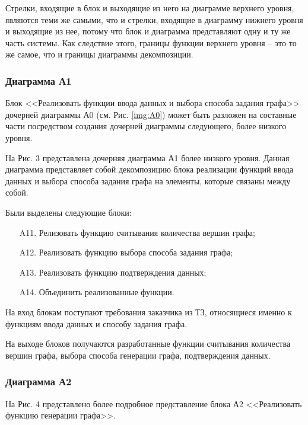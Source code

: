 \documentclass[a4paper, final]{article}
\begin{document}
Стрелки, входящие в блок и выходящие из него на диаграмме верхнего уровня, являются теми же самыми, что и стрелки, 
входящие в диаграмму нижнего уровня и выходящие из нее, потому что блок и диаграмма представляют одну и ту же 
часть системы. Как следствие этого, границы функции верхнего уровня 
-- это то же самое, что и границы диаграммы декомпозиции.

\newpage
\hypertarget{img:A0}{}



\subsubsection{Диаграмма А1}
Блок <<Реализовать функции ввода данных и выбора способа задания графа>> дочерней диаграммы А0 (см. Рис. \ref{img:A0}) может 
быть разложен на составные части посредством создания дочерней диаграммы следующего, более низкого уровня.

На Рис. 3 представлена дочерняя диаграмма А1 более низкого уровня. Данная диаграмма представляет собой 
декомпозицию блока реализации функций ввода данных и выбора способа задания графа на элементы, которые связаны 
между собой. 

Были выделены следующие блоки:
\begin{itemize}
	\item[A11.] Релизовать функцию считывания количества вершин графа;
	\item[A12.] Реализовать функцию выбора способа задания графа;
	\item[A13.] Реализовать функцию подтверждения данных;
	\item[A14.] Объединить реализованные функции.
\end{itemize} 

На вход блокам поступают требования заказчика из ТЗ, относящиеся именно к функциям ввода данных и способу 
задания графа.

На выходе блоков получаются разработанные функции считывания количества вершин графа, выбора способа генерации графа,
подтверждения данных.

\newpage
\hypertarget{img:A1}{}



\subsubsection{Диаграмма А2}
На Рис. 4 представлено более подробное представление блока А2 <<Реализовать функцию генерации графа>>.
\end{document}
